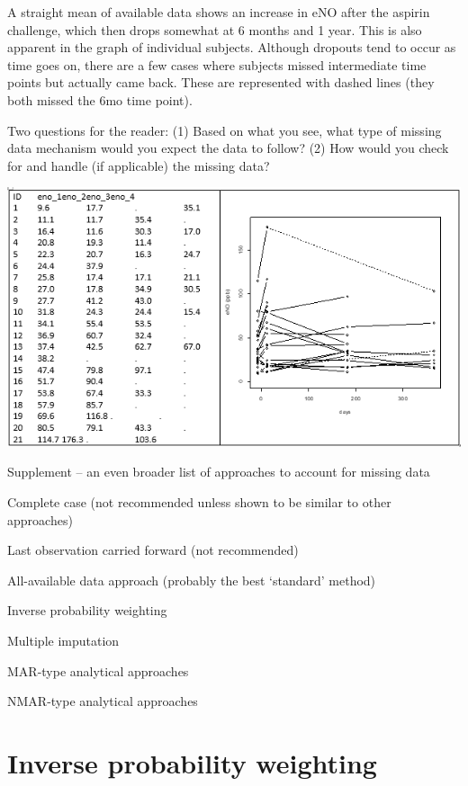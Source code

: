 \documentclass[
  9pt,
  ignorenonframetext,
]{beamer}
\begin{document}
\begin{frame}{}
\protect\hypertarget{section-14}{}
A straight mean of available data shows an increase in eNO after the
aspirin challenge, which then drops somewhat at 6 months and 1 year.
This is also apparent in the graph of individual subjects. Although
dropouts tend to occur as time goes on, there are a few cases where
subjects missed intermediate time points but actually came back. These
are represented with dashed lines (they both missed the 6mo time point).

Two questions for the reader: (1) Based on what you see, what type of
missing data mechanism would you expect the data to follow? (2) How
would you check for and handle (if applicable) the missing data?
\end{frame}

\begin{frame}{}
\protect\hypertarget{section-15}{}
\begin{center}\includegraphics[width=0.7\linewidth]{figs_L20/f12} \end{center}

Supplement -- an even broader list of approaches to account for missing
data
\end{frame}

\begin{frame}{}
\protect\hypertarget{section-16}{}
Complete case (not recommended unless shown to be similar to other
approaches)

Last observation carried forward (not recommended)

All-available data approach (probably the best `standard' method)

Inverse probability weighting

Multiple imputation

MAR-type analytical approaches

NMAR-type analytical approaches
\end{frame}

\hypertarget{inverse-probability-weighting}{%
\section{Inverse probability
weighting}\label{inverse-probability-weighting}}
\end{document}
